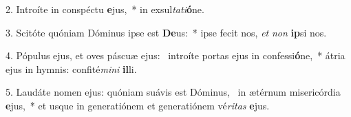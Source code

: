 2. Introíte in conspéctu \textbf{e}jus,~*  in exsul\textit{ta}\textit{ti}\textbf{ó}ne.\

3. Scitóte quóniam Dóminus ipse est \textbf{De}us:~*  ipse fecit nos, \textit{et} \textit{non} \textbf{ip}si nos.\

4. Pópulus ejus, et oves páscuæ ejus: \dag\  introíte portas ejus in confessi\textbf{ó}ne,~*  átria ejus in hymnis: confité\textit{mi}\textit{ni} \textbf{il}li.\

5. Laudáte nomen ejus: quóniam suávis est Dóminus, \dag\  in ætérnum misericórdia \textbf{e}jus,~*  et usque in generatiónem et generatiónem vé\textit{ri}\textit{tas} \textbf{e}jus.\

